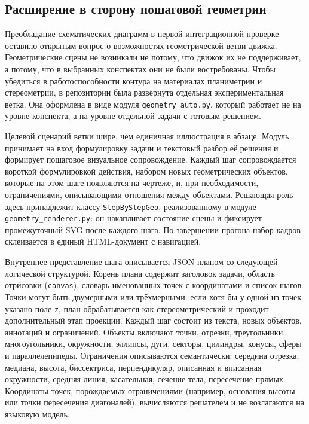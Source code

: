\subsection{Расширение в сторону пошаговой геометрии}
\label{sec:ch3:geometry}

Преобладание схематических диаграмм в первой интеграционной проверке оставило открытым вопрос о возможностях геометрической ветви движка. Геометрические сцены не возникали не потому, что движок их не поддерживает, а потому, что в выбранных конспектах они не были востребованы. Чтобы убедиться в работоспособности контура на материалах планиметрии и стереометрии, в репозитории была развёрнута отдельная экспериментальная ветка. Она оформлена в виде модуля \texttt{geometry\_auto.py}, который работает не на уровне конспекта, а на уровне отдельной задачи с готовым решением.

Целевой сценарий ветки шире, чем единичная иллюстрация в абзаце. Модуль принимает на вход формулировку задачи и текстовый разбор её решения и формирует пошаговое визуальное сопровождение. Каждый шаг сопровождается короткой формулировкой действия, набором новых геометрических объектов, которые на этом шаге появляются на чертеже, и, при необходимости, ограничениями, описывающими отношения между объектами. Решающая роль здесь принадлежит классу \texttt{StepByStepGeo}, реализованному в модуле \texttt{geometry\_renderer.py}: он накапливает состояние сцены и фиксирует промежуточный SVG после каждого шага. По завершении прогона набор кадров склеивается в единый HTML\nobreakdash-документ с навигацией.

Внутреннее представление шага описывается JSON\nobreakdash-планом со следующей логической структурой. Корень плана содержит заголовок задачи, область отрисовки (\texttt{canvas}), словарь именованных точек с координатами и список шагов. Точки могут быть двумерными или трёхмерными: если хотя бы у одной из точек указано поле \texttt{z}, план обрабатывается как стереометрический и проходит дополнительный этап проекции. Каждый шаг состоит из текста, новых объектов, аннотаций и ограничений. Объекты включают точки, отрезки, треугольники, многоугольники, окружности, эллипсы, дуги, секторы, цилиндры, конусы, сферы и параллелепипеды. Ограничения описываются семантически: середина отрезка, медиана, высота, биссектриса, перпендикуляр, описанная и вписанная окружности, средняя линия, касательная, сечение тела, пересечение прямых. Координаты точек, порождаемых ограничениями (например, основания высоты или точки пересечения диагоналей), вычисляются решателем и не возлагаются на языковую модель.

